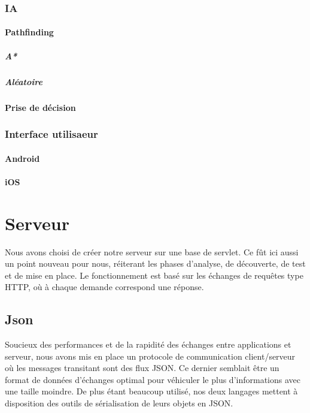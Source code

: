 \documentclass[]{report}
\begin{document}
			\subsubsection{IA}
				\paragraph{Pathfinding}
					\subparagraph{A*}
					\subparagraph{Aléatoire}
				\paragraph{Prise de décision}
			\subsubsection{Interface utilisaeur}
				\paragraph{Android}
				\paragraph{iOS}
		
	\section{Serveur}
		Nous avons choisi de créer notre serveur sur une base de servlet. Ce fût ici
		aussi un point nouveau pour nous, réiterant les phases d'analyse, de
		découverte, de test et de mise en place. Le fonctionnement est basé sur les
		échanges de requêtes type HTTP, où à chaque demande correspond une réponse. 
		
		\subsection{Json}
		Soucieux des performances et de la rapidité des échanges entre applications et
		serveur, nous avons mis en place un protocole de communication client/serveur
		où les messages transitant sont des flux JSON. Ce dernier semblait être un
		format de données d'échanges optimal pour véhiculer le plus d'informations
		avec une taille moindre. De plus étant beaucoup utilisé, nos deux langages
		mettent à disposition des outils de sérialisation de leurs objets en JSON.
		
\end{document}
